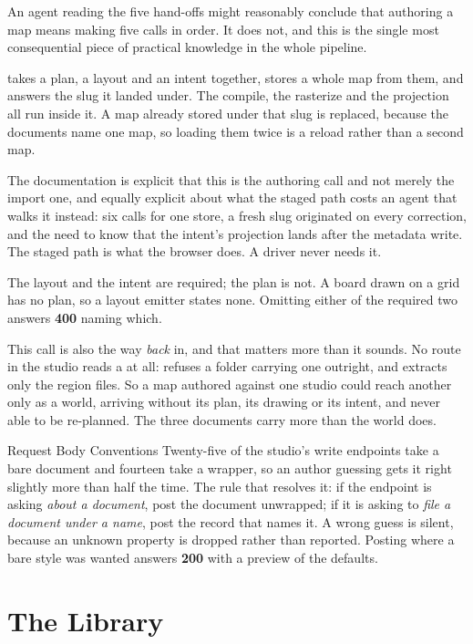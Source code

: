 An agent reading the five hand-offs might reasonably conclude that authoring a map
means making five calls in order. It does not, and this is the single most
consequential piece of practical knowledge in the whole pipeline.

 takes a plan, a layout and an intent
together, stores a whole map from them, and answers the slug it landed under. The
compile, the rasterize and the projection all run inside it. A map already stored
under that slug is replaced, because the documents name one map, so loading them
twice is a reload rather than a second map.

The documentation is explicit that this is the authoring call and not merely the
import one, and equally explicit about what the staged path costs an agent that
walks it instead: six calls for one store, a fresh slug originated on every
correction, and the need to know that the intent's projection lands after the
metadata write. The staged path is what the browser does. A driver never needs it.

The layout and the intent are required; the plan is not. A board drawn on a grid
has no plan, so a layout emitter states none. Omitting either of the required two
answers \textbf{400} naming which.

This call is also the way \emph{back} in, and that matters more than it sounds.
No route in the studio reads a  at all: 
refuses a folder carrying one outright, and  extracts only the
region files. So a map authored against one studio could reach another only as a
world, arriving without its plan, its drawing or its intent, and never able to be
re-planned. The three documents carry more than the world does.

\begin{ruling}{Request Body Conventions}
Twenty-five of the studio's write endpoints take a bare document and fourteen take
a wrapper, so an author guessing gets it right slightly more than half the time.
The rule that resolves it: if the endpoint is asking \emph{about a document}, post
the document unwrapped; if it is asking to \emph{file a document under a name},
post the record that names it. A wrong guess is silent, because an unknown
property is dropped rather than reported. Posting 
where a bare style was wanted answers \textbf{200} with a preview of the defaults.
\end{ruling}

\section{The Library}

